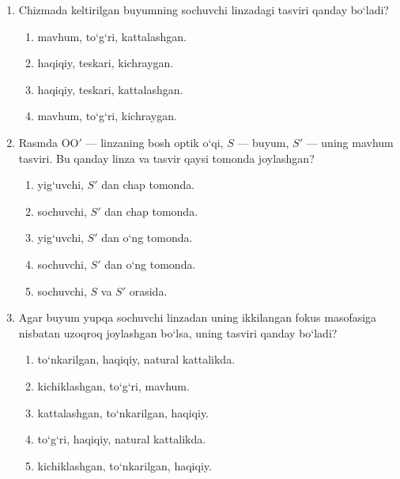 \begin{enumerate}
\item Chizmada keltirilgan buyumning sochuvchi linzadagi tasviri qanday bo‘ladi?


\begin{enumerate}[label=\Alph*)]
\item mavhum, to‘g‘ri, kattalashgan.
\item haqiqiy, teskari, kichraygan.
\item haqiqiy, teskari, kattalashgan.
\item mavhum, to‘g‘ri, kichraygan.
\end{enumerate}

\item Rasmda OO$'$ — linzaning bosh optik o‘qi, $S$ — buyum, $S'$ — uning mavhum tasviri. Bu qanday linza va tasvir qaysi tomonda joylashgan?


\begin{enumerate}[label=\Alph*)]
\item yig‘uvchi, $S'$ dan chap tomonda.
\item sochuvchi, $S'$ dan chap tomonda.
\item yig‘uvchi, $S'$ dan o‘ng tomonda.
\item sochuvchi, $S'$ dan o‘ng tomonda.
\item sochuvchi, $S$ va $S'$ orasida.
\end{enumerate}

\item Agar buyum yupqa sochuvchi linzadan uning ikkilangan fokus masofasiga nisbatan uzoqroq joylashgan bo‘lsa, uning tasviri qanday bo‘ladi?

\begin{enumerate}[label=\Alph*)]
\item to‘nkarilgan, haqiqiy, natural kattalikda.
\item kichiklashgan, to‘g‘ri, mavhum.
\item kattalashgan, to‘nkarilgan, haqiqiy.
\item to‘g‘ri, haqiqiy, natural kattalikda.
\item kichiklashgan, to‘nkarilgan, haqiqiy.
\end{enumerate}


\end{enumerate}
